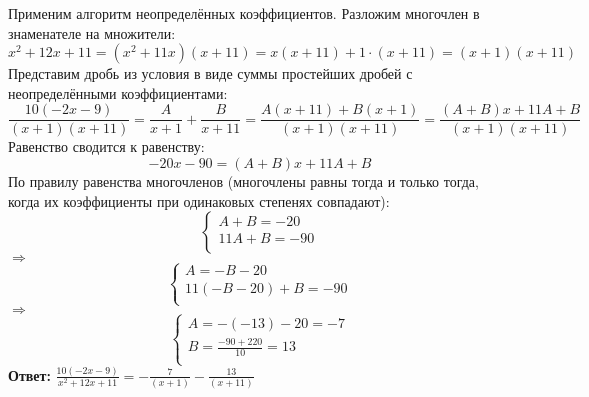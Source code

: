 \documentclass[a4paper]{article}
\begin{document}
Применим алгоритм неопределённых коэффициентов. Разложим многочлен в знаменателе на множители:
\[x^2+12x+11=(x^2+11x)(x+11)=x(x+11)+1\cdot(x+11)=(x+1)(x+11)\]
Представим дробь из условия в виде суммы простейших дробей с неопределёнными коэффициентами:
\[\frac{10(-2x-9)}{(x+1)(x+11)}=\frac{A}{x+1}+\frac{B}{x+11}=\frac{A(x+11)+B(x+1)}{(x+1)(x+11)}=\frac{(A+B)x+11A+B}{(x+1)(x+11)}\]
Равенство сводится к равенству:
\[-20x-90=(A+B)x+11A+B\]
По правилу равенства многочленов (многочлены равны тогда и только тогда, когда их коэффициенты при одинаковых степенях совпадают):
\begin{equation*}
 \begin{cases}
   	A+B=-20
   	\\
   	11A+B=-90
   	\\
 \end{cases}
\end{equation*}
$\Rightarrow$
\begin{equation*}
 \begin{cases}
   	A=-B-20
   	\\
   	11(-B-20)+B=-90
   	\\
 \end{cases}
\end{equation*}
$\Rightarrow$
\begin{equation*}
 \begin{cases}
   	A=-(-13)-20=-7
   	\\
   	B=\frac{-90+220}{10}=13
   	\\
 \end{cases}
\end{equation*}
\textbf{Ответ:} $\frac{10(-2x-9)}{x^2+12x+11}=-\frac{7}{(x+1)}-\frac{13}{(x+11)}$

\end{document}
